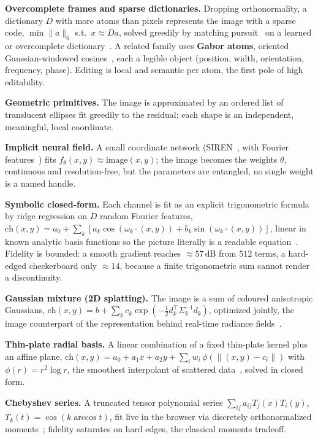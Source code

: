 \documentclass[journal]{IEEEtran}
\begin{document}
\textbf{Overcomplete frames and sparse dictionaries.} Dropping orthonormality, a dictionary $D$ with
more atoms than pixels represents the image with a sparse code, $\min\lVert a\rVert_0$ s.t.\
$x\approx Da$, solved greedily by matching pursuit~\cite{mallat1993} on a learned or
overcomplete dictionary~\cite{aharon2006}. A related family uses \textbf{Gabor atoms}, oriented
Gaussian-windowed cosines~\cite{daugman1985}, each a legible object (position, width, orientation,
frequency, phase). Editing is local and semantic per atom, the first pole of high editability.

\textbf{Geometric primitives.} The image is approximated by an ordered list of translucent ellipses
fit greedily to the residual; each shape is an independent, meaningful, local coordinate.

\textbf{Implicit neural field.} A small coordinate network (SIREN~\cite{sitzmann2020}, with Fourier
features~\cite{tancik2020}) fits $f_\theta(x,y)\approx\text{image}(x,y)$; the image becomes the
weights $\theta$, continuous and resolution-free, but the parameters are entangled, no single weight
is a named handle.

\textbf{Symbolic closed-form.} Each channel is fit as an explicit trigonometric formula by ridge
regression on $D$ random Fourier features, $\text{ch}(x,y)=a_0+\sum_k[a_k\cos(\omega_k\!\cdot\!(x,y))
+b_k\sin(\omega_k\!\cdot\!(x,y))]$, linear in known analytic basis functions so the picture literally
is a readable equation~\cite{stanley2007}. Fidelity is bounded: a smooth gradient reaches
$\approx57$\,dB from $512$ terms, a hard-edged checkerboard only $\approx14$, because a finite
trigonometric sum cannot render a discontinuity.

\textbf{Gaussian mixture (2D splatting).} The image is a sum of coloured anisotropic Gaussians,
$\text{ch}(x,y)=b+\sum_k c_k\exp(-\tfrac12 d_k^\top\Sigma_k^{-1}d_k)$, optimized jointly, the image
counterpart of the representation behind real-time radiance
fields~\cite{kerbl2023,gaussianimage2024}.

\textbf{Thin-plate radial basis.} A linear combination of a fixed thin-plate kernel plus an affine
plane, $\text{ch}(x,y)=a_0+a_1x+a_2y+\sum_i w_i\,\phi(\lVert(x,y)-c_i\rVert)$ with $\phi(r)=r^2\log r$,
the smoothest interpolant of scattered data~\cite{bookstein1989}, solved in closed form.

\textbf{Chebyshev series.} A truncated tensor polynomial series $\sum_{ij}a_{ij}T_j(x)T_i(y)$,
$T_k(t)=\cos(k\arccos t)$, fit live in the browser via discretely orthonormalized
moments~\cite{mukundan2001}; fidelity saturates on hard edges, the classical moments tradeoff.
\end{document}
